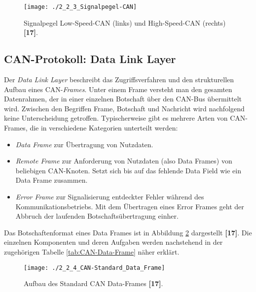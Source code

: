 \begin{figure}[!htbp]
	\centering
	\texttt{[image: ./2\_2\_3\_Signalpegel-CAN]}
	\caption[CAN-Signalpegel]{Signalpegel Low-Speed-\acs{CAN} (links) und High-Speed-\acs{CAN} (rechts) \textbf{[17]}.}
	\label{abb:CANSignalpegel}
\end{figure}

\subsection{CAN-Protokoll: Data Link Layer} \label{subsec:DataLinkLayer}
Der \emph{Data Link Layer} beschreibt das Zugriffsverfahren und den strukturellen Aufbau eines \acs{CAN}-\emph{Frames}. Unter einem Frame versteht man den gesamten Datenrahmen, der in einer einzelnen Botschaft über den \acs{CAN}-Bus übermittelt wird. Zwischen den Begriffen Frame, Botschaft und Nachricht wird nachfolgend keine Unterscheidung getroffen. Typischerweise gibt es mehrere Arten von CAN-Frames, die in verschiedene Kategorien unterteilt werden:

\begin{itemize}
	\item \emph{Data Frame} zur Übertragung von Nutzdaten.
	\item \emph{Remote Frame} zur Anforderung von Nutzdaten (also Data Frames) von beliebigen CAN-Knoten. Setzt sich bis auf das fehlende Data Field wie ein Data Frame zusammen.
	\item \emph{Error Frame} zur Signalisierung entdeckter Fehler während des Kommunikationsbetriebs. Mit dem Übertragen eines Error Frames geht der Abbruch der laufenden Botschaftsübertragung einher.
\end{itemize} 

Das Botschaftenformat eines Data Frames ist in Abbildung \ref{abb:CANDataFrame} dargestellt \textbf{[17]}. Die einzelnen Komponenten und deren Aufgaben werden nachstehend in der zugehörigen Tabelle \ref{tab:CAN-Data-Frame} näher erklärt.

\begin{figure}[!htbp]
	\centering
	\texttt{[image: ./2\_2\_4\_CAN-Standard\_Data\_Frame]}
	\caption[CAN-Signalpegel]{Aufbau des Standard \acs{CAN} Data-Frames \textbf{[17]}.}
	\label{abb:CANDataFrame}
\end{figure}

